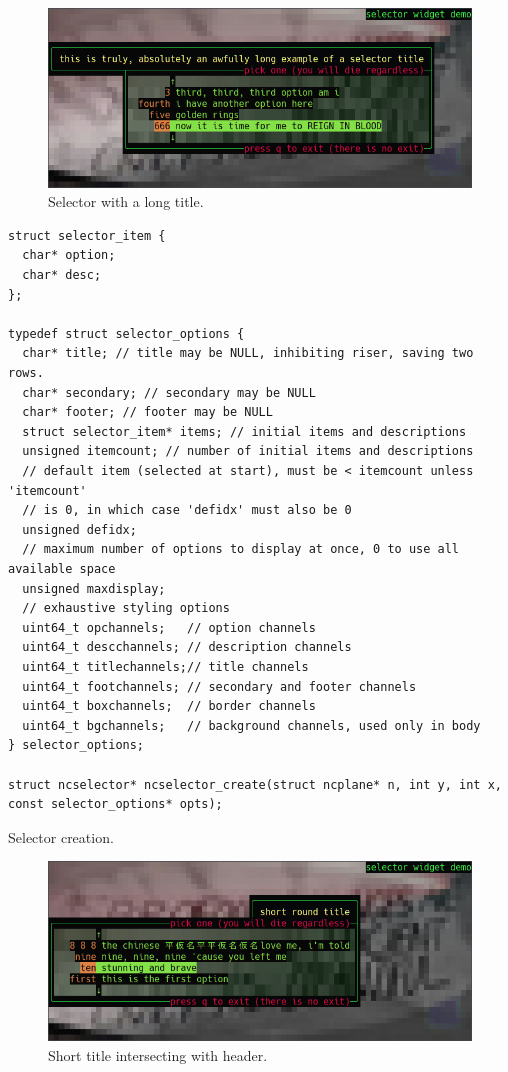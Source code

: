 \documentclass[letterpaper,10pt]{article}
\begin{document}
\begin{figure}[!htb]
    \centering
    \includegraphics[width=.75\linewidth]{media/selector1.png}
    \caption{Selector with a long title.}
\end{figure}

\begin{listing}[!htb]
\begin{verbatim}
struct selector_item {
  char* option;
  char* desc;
};

typedef struct selector_options {
  char* title; // title may be NULL, inhibiting riser, saving two rows.
  char* secondary; // secondary may be NULL
  char* footer; // footer may be NULL
  struct selector_item* items; // initial items and descriptions
  unsigned itemcount; // number of initial items and descriptions
  // default item (selected at start), must be < itemcount unless 'itemcount'
  // is 0, in which case 'defidx' must also be 0
  unsigned defidx;
  // maximum number of options to display at once, 0 to use all available space
  unsigned maxdisplay;
  // exhaustive styling options
  uint64_t opchannels;   // option channels
  uint64_t descchannels; // description channels
  uint64_t titlechannels;// title channels
  uint64_t footchannels; // secondary and footer channels
  uint64_t boxchannels;  // border channels
  uint64_t bgchannels;   // background channels, used only in body
} selector_options;

struct ncselector* ncselector_create(struct ncplane* n, int y, int x, const selector_options* opts);
\end{verbatim}
\caption{Selector creation.}
\end{listing}

\begin{figure}[!htb]
    \centering
    \includegraphics[width=.75\linewidth]{media/selector2.png}
    \caption{Short title intersecting with header.}
\end{figure}
\end{document}
